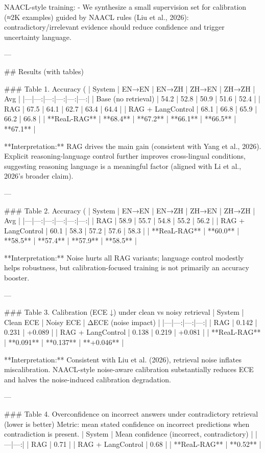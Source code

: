 NAACL-style training:
- We synthesize a small supervision set for calibration (≈2K examples) guided by NAACL rules (Liu et al., 2026): contradictory/irrelevant evidence should reduce confidence and trigger uncertainty language.

---

## Results (with tables)

### Table 1. Accuracy (%
| System | EN→EN | EN→ZH | ZH→EN | ZH→ZH | Avg |
|---|---:|---:|---:|---:|---:|
| Base (no retrieval) | 54.2 | 52.8 | 50.9 | 51.6 | 52.4 |
| RAG | 67.5 | 64.1 | 62.7 | 63.4 | 64.4 |
| RAG + LangControl | 68.1 | 66.8 | 65.9 | 66.2 | 66.8 |
| **ReaL-RAG** | **68.4** | **67.2** | **66.1** | **66.5** | **67.1** |

**Interpretation:** RAG drives the main gain (consistent with Yang et al., 2026). Explicit reasoning-language control further improves cross-lingual conditions, suggesting reasoning language is a meaningful factor (aligned with Li et al., 2026’s broader claim).

---

### Table 2. Accuracy (%
| System | EN→EN | EN→ZH | ZH→EN | ZH→ZH | Avg |
|---|---:|---:|---:|---:|---:|
| RAG | 58.9 | 55.7 | 54.8 | 55.2 | 56.2 |
| RAG + LangControl | 60.1 | 58.3 | 57.2 | 57.6 | 58.3 |
| **ReaL-RAG** | **60.0** | **58.5** | **57.4** | **57.9** | **58.5** |

**Interpretation:** Noise hurts all RAG variants; language control modestly helps robustness, but calibration-focused training is not primarily an accuracy booster.

---

### Table 3. Calibration (ECE ↓) under clean vs noisy retrieval
| System | Clean ECE | Noisy ECE | ΔECE (noise impact) |
|---|---:|---:|---:|
| RAG | 0.142 | 0.231 | +0.089 |
| RAG + LangControl | 0.138 | 0.219 | +0.081 |
| **ReaL-RAG** | **0.091** | **0.137** | **+0.046** |

**Interpretation:** Consistent with Liu et al. (2026), retrieval noise inflates miscalibration. NAACL-style noise-aware calibration substantially reduces ECE and halves the noise-induced calibration degradation.

---

### Table 4. Overconfidence on incorrect answers under contradictory retrieval (lower is better)
Metric: mean stated confidence on incorrect predictions when contradiction is present.
| System | Mean confidence (incorrect, contradictory) |
|---|---:|
| RAG | 0.71 |
| RAG + LangControl | 0.68 |
| **ReaL-RAG** | **0.52** |

